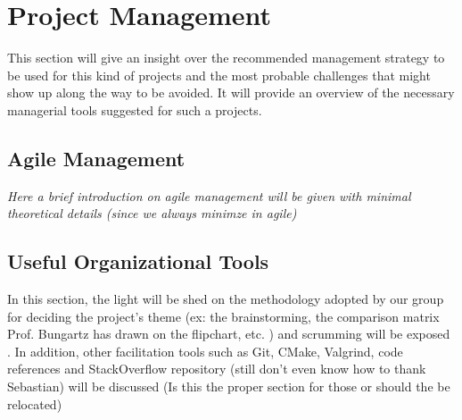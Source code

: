 \section{Project Management}
This section will give an insight over the recommended management strategy to be used for this kind of projects and the most probable challenges that might show up along the way to be avoided. It will provide an overview of the necessary managerial tools suggested for such a projects.


\subsection{Agile Management}
\textit{Here a brief introduction on agile management will be given with minimal theoretical details (since we always minimze in agile)}


\subsection{Useful Organizational Tools}
In this section, the light will be shed on the methodology adopted by our group for deciding the project's theme (ex: the brainstorming, the comparison matrix Prof. Bungartz has drawn on the flipchart, etc. ) and scrumming will be exposed . In addition, other facilitation tools such as Git, CMake, Valgrind, code references and StackOverflow repository (still don't even know how to thank Sebastian) will be discussed (Is this the proper section for those or should the be relocated)
